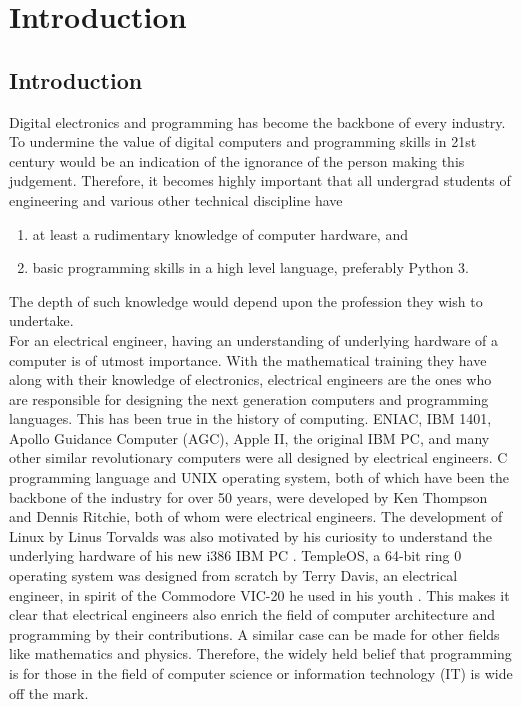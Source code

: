 \chapter{\centering Introduction}
\section{Introduction}
Digital electronics and programming has become the backbone of every industry. To undermine the value of digital computers and programming skills in 21st century would be an indication of the ignorance of the person making this judgement. Therefore, it becomes highly important that all undergrad students of engineering and various other technical discipline have 
\begin{enumerate}
   \item at least a rudimentary knowledge of computer hardware, and 
   \item basic programming skills in a high level language, preferably Python 3.
\end{enumerate}
The depth of such knowledge would depend upon the profession they wish to undertake.\\
For an electrical engineer, having an understanding of underlying hardware of a computer is of utmost importance. With the mathematical training they have along with their knowledge of electronics, electrical engineers are the ones who are responsible for designing the next generation computers and programming languages. This has been true in the history of computing. ENIAC, IBM 1401, Apollo Guidance Computer (AGC), Apple II, the original IBM PC, and many other similar revolutionary computers were all designed by electrical engineers. C programming language and UNIX operating system, both of which have been the backbone of the industry for over 50 years, were developed by Ken Thompson and Dennis Ritchie, both of whom were electrical engineers. The development of Linux by Linus Torvalds was also motivated by his curiosity to understand the underlying hardware of his new i386 IBM PC \cite{torvalds2001just}. TempleOS, a 64-bit ring 0 operating system was designed from scratch by Terry Davis, an electrical engineer, in spirit of the Commodore VIC-20 he used in his youth \cite{kyrou2017art}. This makes it clear that electrical engineers also enrich the field of computer architecture and programming by their contributions. A similar case can be made for other fields like mathematics and physics. Therefore, the widely held belief that programming is for those in the field of computer science or information technology (IT) is wide off the mark.\\
